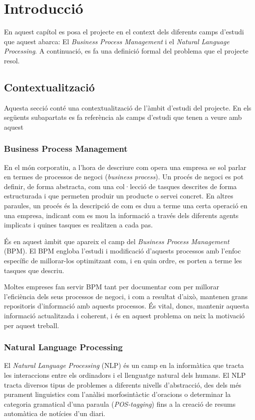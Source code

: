 \chapter{Introducció}
\label{sec:introduccio}

En aquest capítol es posa el projecte en el context dels diferents camps d'estudi que aquest abarca: El \emph{Business Process Management} i el \emph{Natural Language Processing}. A continuació, es fa una definició formal del problema que el projecte resol.

\section{Contextualització}
\label{sec:introduccio-contextualitzacio}

Aquesta secció conté una contextualització de l'àmbit d'estudi del projecte. En els següents subapartats es fa referència als camps d'estudi que tenen a veure amb aquest 

\subsection{Business Process Management}
\label{sec:introduccio-bpm}
En el món corporatiu, a l'hora de descriure com opera una empresa se sol parlar en termes de processos de negoci (\emph{business process}). Un procés de negoci es pot definir, de forma abstracta, com una col·lecció de tasques descrites de forma estructurada i que permeten produir un producte o servei concret. En altres paraules, un procés és la descripció de com es duu a terme una certa operació en una empresa, indicant com es mou la informació a través dels diferents agents implicats i quines tasques es realitzen a cada pas.

És en aquest àmbit que apareix el camp del \emph{Business Process Management} (BPM). El BPM engloba l'estudi i modificació d'aquests processos amb l'enfoc específic de millorar-los optimitzant com, i en quin ordre, es porten a terme les tasques que descriu.

Moltes empreses fan servir BPM tant per documentar com per millorar l'eficiència dels seus processos de negoci, i com a resultat d'això, mantenen grans repositoris d'informació amb aquests processos. És vital, doncs, mantenir aquesta informació actualitzada i coherent, i és en aquest problema on neix la motivació per aquest treball.

\subsection{Natural Language Processing}
El \emph{Natural Language Processing} (NLP) és un camp en la informàtica que tracta les interaccions entre els ordinadors i el llenguatge natural dels humans. El NLP tracta diversos tipus de problemes a diferents nivells d'abstracció, des dels més purament linguistics com l'anàlisi morfosintàctic d'oracions o determinar la categoria gramatical d'una paraula (\emph{POS-tagging}) fins a la creació de resums automàtica de notícies d'un diari.


